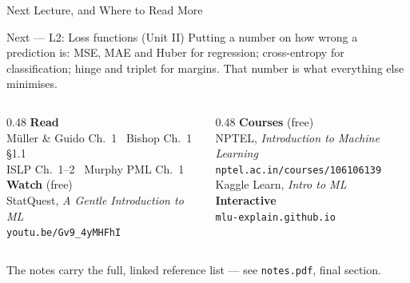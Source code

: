 \documentclass[aspectratio=169]{beamer}
\begin{document}
\begin{frame}[shrink=10]{Next Lecture, and Where to Read More}
  \begin{block}{Next --- L2: Loss functions (Unit II)}
    Putting a number on how wrong a prediction is: MSE, MAE and Huber for
    regression; cross-entropy for classification; hinge and triplet for margins.
    That number is what everything else minimises.
  \end{block}
  \vspace{0.2em}
  \begin{columns}[T]
    \begin{column}{0.48\textwidth}
      {\footnotesize
      \textbf{Read}\\
      M\"uller \& Guido Ch.~1 \textbullet\ Bishop Ch.~1 \S1.1\\
      ISLP Ch.~1--2 \textbullet\ Murphy PML Ch.~1\\[4pt]
      \textbf{Watch} (free)\\
      StatQuest, \emph{A Gentle Introduction to ML}\\
      \texttt{youtu.be/Gv9\_4yMHFhI}}
    \end{column}
    \begin{column}{0.48\textwidth}
      {\footnotesize
      \textbf{Courses} (free)\\
      NPTEL, \emph{Introduction to Machine Learning}\\
      \texttt{nptel.ac.in/courses/106106139}\\
      Kaggle Learn, \emph{Intro to ML}\\[4pt]
      \textbf{Interactive}\\
      \texttt{mlu-explain.github.io}}
    \end{column}
  \end{columns}
  \vspace{0.2em}
  \begin{center}\small
  The notes carry the full, linked reference list --- see \texttt{notes.pdf}, final section.
  \end{center}
\end{frame}

\UPESThankYouFrame
\end{document}
